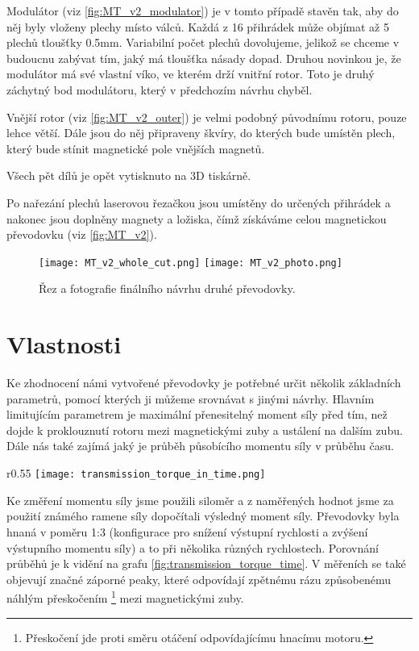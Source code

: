 Modulátor (viz \autoref{fig:MT_v2_modulator}) je v tomto případě stavěn tak, aby do něj byly vloženy plechy místo válců. Každá z 16 přihrádek může objímat až 5 plechů tloušťky 0.5mm. Variabilní počet plechů dovolujeme, jelikož se chceme v budoucnu zabývat tím, jaký má tloušťka násady dopad. Druhou novinkou je, že modulátor má své vlastní víko, ve kterém drží vnitřní rotor. Toto je druhý záchytný bod modulátoru, který v předchozím návrhu chyběl.

Vnější rotor (viz \autoref{fig:MT_v2_outer}) je velmi podobný původnímu rotoru, pouze lehce větší. Dále jsou do něj připraveny škvíry, do kterých bude umístěn plech, který bude stínit magnetické pole vnějších magnetů.

\clearpage
{
    Všech pět dílů je opět vytisknuto na 3D tiskárně. 
    \raggedright
    Po nařezání plechů laserovou řezačkou jsou umístěny do určených přihrádek a nakonec jsou doplněny magnety a ložiska, čímž získáváme celou magnetickou převodovku (viz \autoref{fig:MT_v2}).
}

\begin{figure}[H]
    \texttt{[image: MT\_v2\_whole\_cut.png]}
    \texttt{[image: MT\_v2\_photo.png]}
    \centering
    \caption{Řez a fotografie finálního návrhu druhé převodovky.}
    \label{fig:MT_v2}
\end{figure}

\section{Vlastnosti}

Ke zhodnocení námi vytvořené převodovky je potřebné určit několik základních parametrů, pomocí kterých ji můžeme srovnávat s jinými návrhy. Hlavním limitujícím parametrem je maximální přenesitelný moment síly před tím, než dojde k proklouznutí rotoru mezi magnetickými zuby a ustálení na dalším zubu. Dále nás také zajímá jaký je průběh působícího momentu síly v průběhu času.

\begin{wrapfigure}{r}{0.55\textwidth}
    \vspace{-1cm}
    \texttt{[image: transmission\_torque\_in\_time.png]}
    \caption{Průběh momentu síly v čase při různých úhlových rychlostech u převodovky v konfiguraci 1:3}
    \label{fig:transmission_torque_time}
\end{wrapfigure}

Ke změření momentu síly jsme použili siloměr a z naměřených hodnot jsme za použití známého ramene síly dopočítali výsledný moment síly. Převodovky byla hnaná v poměru 1:3 (konfigurace pro snížení výstupní rychlosti a zvýšení výstupního momentu síly) a to při několika různých rychlostech. Porovnání průběhů je k vidění na grafu \ref{fig:transmission_torque_time}. V měřeních se také objevují značné záporné peaky, které odpovídají zpětnému rázu způsobenému náhlým přeskočením \footnote{Přeskočení jde proti směru otáčení odpovídajícímu hnacímu motoru.} mezi magnetickými zuby.
\clearpage

